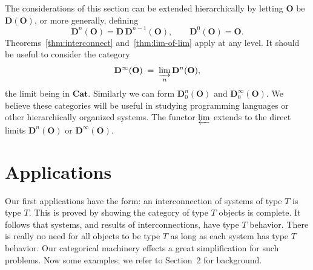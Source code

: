 \documentclass[10pt,a4paper,twocolumn]{article}
\newcommand{\Ocat}{\mathbf{O}}          %
\newcommand{\Dcat}{\mathbf{D}}          %
\begin{document}
The considerations of this section can be extended hierarchically by
letting $\Ocat$ be $\Dcat(\Ocat)$, or more generally, defining
\begin{equation*}
  \Dcat^{n}(\Ocat) = \Dcat\,\Dcat^{n-1}(\Ocat), \qquad
  \Dcat^{0}(\Ocat) = \Ocat.
\end{equation*}
Theorems~\ref{thm:interconnect} and~\ref{thm:lim-of-lim} apply at any level.
It should be useful to consider the category
\begin{equation*}
  \Dcat^{\infty}(\Ocat) \;=\; \varinjlim_{n} \Dcat^{n}(\Ocat),
\end{equation*}
the limit being in $\mathbf{Cat}$.
Similarly we can form $\Dcat_{0}^{n}(\Ocat)$ and $\Dcat_{0}^{\infty}(\Ocat)$.
We believe these categories will be useful in studying programming languages or other hierarchically organized systems.
The functor $\varprojlim$ extends to the direct limits $\Dcat^{n}(\Ocat)$ or $\Dcat^{\infty}(\Ocat)$.

\section{Applications}

Our first applications have the form: an interconnection of systems of type $T$ is type $T$.
This is proved by showing the category of type $T$ objects is complete.
It follows that systems, and results of interconnections, have type $T$ behavior.
There is really no need for all objects to be type $T$ as long as each system has type $T$ behavior.
Our categorical machinery effects a great simplification for such problems.
Now some examples; we refer to Section~2 for background.
\end{document}
